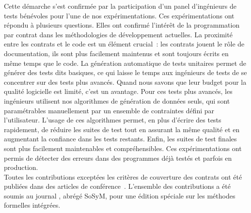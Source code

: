 Cette démarche s'est confirmée par la participation d'un panel d'ingénieurs de
tests bénévoles pour l'une de nos expérimentations. Ces expérimentations ont
répondu à plusieurs questions. Elles ont confirmé l'intérêt de la programmation
par contrat dans les méthodologies de développement actuelles. La proximité
entre les contrats et le code est un élément crucial~: les contrats jouent le
rôle de documentation, ils sont plus facilement maintenus et sont toujours
écrits en même temps que le code. La génération automatique de tests unitaires
permet de générer des tests dits basiques, ce qui laisse le temps aux ingénieurs
de tests de se concentrer sur des tests plus avancés. Quand nous savons que leur
budget pour la qualité logicielle est limité, c'est un avantage. Pour ces tests
plus avancés, les ingénieurs utilisent nos algorithmes de génération de données
seuls, qui sont paramétrables manuellement par un ensemble de contraintes défini
par l'utilisateur. L'usage de ces algorithmes permet, en plus d'écrire des tests
rapidement, de réduire les suites de test tout en assurant la même qualité et en
augmentant la confiance dans les tests restants. Enfin, les suites de test
finales sont plus facilement maintenables et compréhensibles. Ces
expérimentations ont permis de détecter des erreurs dans des programmes déjà
testés et parfois en production.  \\

Toutes les contributions exceptées les critères de couverture des contrats ont
été publiées dans des articles de conférence~. L'ensemble des contributions a été soumis au
journal , abrégé SoSyM, pour une
édition spéciale sur les méthodes formelles intégrées.

\section{}
\label{section:conclusions:summa}

